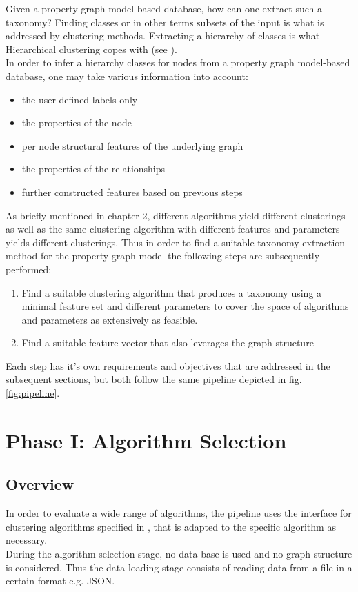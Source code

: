 Given a property graph model-based database, how can one extract such a taxonomy?
Finding classes or in other terms subsets of the input is what is addressed by clustering methods. Extracting a hierarchy of classes is what Hierarchical clustering copes with (see ). \\
In order to infer a hierarchy classes for nodes from a property graph model-based database, one may take various information into account: 
\begin{itemize}
    \item the user-defined labels only
    \item the properties of the node
    \item per node structural features of the underlying graph
    \item the properties of the relationships
    \item further constructed features based on previous steps
\end{itemize}
As briefly mentioned in chapter 2, different algorithms yield different clusterings as well as the same clustering algorithm with different features and parameters yields different clusterings. Thus in order to find a suitable taxonomy extraction method for the property graph model the following steps are subsequently performed:
\begin{enumerate}
    \item Find a suitable clustering algorithm that produces a taxonomy using a minimal feature set and different parameters to cover the space of algorithms and parameters as extensively as feasible.
    \item Find a suitable feature vector that also leverages the graph structure
\end{enumerate}
Each step has it's own requirements and objectives that are addressed in the subsequent sections, but both follow the same pipeline depicted in fig. \ref{fig:pipeline}. \\


\section{Phase I: Algorithm Selection}\label{\positionnumber}
\subsection{Overview}\label{\positionnumber}
    In order to evaluate a wide range of algorithms, the pipeline uses the interface for clustering algorithms specified in , that is adapted to the specific algorithm as necessary. \\
    During the algorithm selection stage, no data base is used and no graph structure is considered. Thus the data loading stage consists of reading data from a file in a certain format e.g. JSON.

